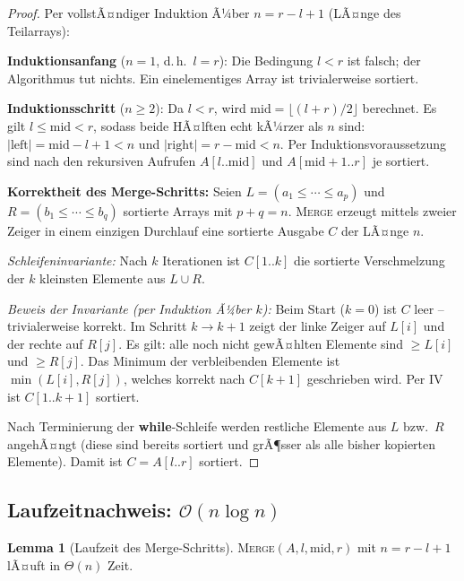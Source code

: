 ﻿\documentclass[a4paper,12pt]{article}
\theoremstyle{definition}
\newtheorem{lemma}{Lemma}
\begin{document}
\begin{proof}
    Per vollstÃ¤ndiger Induktion Ã¼ber $n = r - l + 1$ (LÃ¤nge des Teilarrays):

    \textbf{Induktionsanfang} ($n = 1$, d.\,h.\ $l = r$): Die Bedingung
    $l < r$ ist falsch; der Algorithmus tut nichts. Ein einelementiges Array
    ist trivialerweise sortiert. \checkmark

    \textbf{Induktionsschritt} ($n \geq 2$): Da $l < r$, wird
    $\mathrm{mid} = \lfloor (l+r)/2 \rfloor$ berechnet.
    Es gilt $l \leq \mathrm{mid} < r$, sodass beide HÃ¤lften echt kÃ¼rzer als
    $n$ sind: $|\mathrm{left}| = \mathrm{mid} - l + 1 < n$ und
    $|\mathrm{right}| = r - \mathrm{mid} < n$.
    Per Induktionsvoraussetzung sind nach den rekursiven Aufrufen
    $A[l..\mathrm{mid}]$ und $A[\mathrm{mid}+1..r]$ je sortiert.

    \textbf{Korrektheit des Merge-Schritts:}
    Seien $L = (a_1 \leq \cdots \leq a_p)$ und $R = (b_1 \leq \cdots \leq b_q)$
    sortierte Arrays mit $p + q = n$. \textsc{Merge} erzeugt mittels zweier
    Zeiger in einem einzigen Durchlauf eine sortierte Ausgabe $C$ der LÃ¤nge $n$.

    \emph{Schleifeninvariante:} Nach $k$ Iterationen ist $C[1..k]$ die
    sortierte Verschmelzung der $k$ kleinsten Elemente aus $L \cup R$.

    \emph{Beweis der Invariante (per Induktion Ã¼ber $k$):} Beim Start ($k=0$)
    ist $C$ leer -- trivialerweise korrekt. Im Schritt $k \to k+1$ zeigt
    der linke Zeiger auf $L[i]$ und der rechte auf $R[j]$. Es gilt:
    alle noch nicht gewÃ¤hlten Elemente sind $\geq L[i]$ und $\geq R[j]$.
    Das Minimum der verbleibenden Elemente ist $\min(L[i], R[j])$, welches
    korrekt nach $C[k+1]$ geschrieben wird. Per IV ist $C[1..k+1]$ sortiert.

    Nach Terminierung der \textbf{while}-Schleife werden restliche Elemente aus
    $L$ bzw.\ $R$ angehÃ¤ngt (diese sind bereits sortiert und grÃ¶sser als alle
    bisher kopierten Elemente). Damit ist $C = A[l..r]$ sortiert. \qedhere
\end{proof}

\subsection{Laufzeitnachweis: $\mathcal{O}(n \log n)$}

\begin{lemma}[Laufzeit des Merge-Schritts]
    \label{lemma:merge_time}
    \textsc{Merge}$(A, l, \mathrm{mid}, r)$ mit $n = r - l + 1$ lÃ¤uft in
    $\Theta(n)$ Zeit.
\end{lemma}
\end{document}
